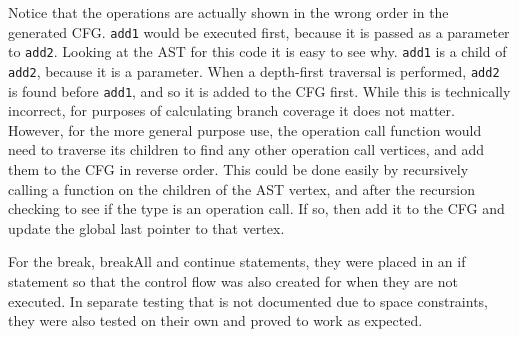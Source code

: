 Notice that the operations are actually shown in the wrong order in the generated CFG. \verb|add1| would be executed first, because it is passed as a parameter to \verb|add2|. Looking at the AST for this code it is easy to see why. \verb|add1| is a child of \verb|add2|, because it is a parameter. When a depth-first traversal is performed, \verb|add2| is found before \verb|add1|, and so it is added to the CFG first. While this is technically incorrect, for purposes of calculating branch coverage it does not matter. However, for the more general purpose use, the operation call function would need to traverse its children to find any other operation call vertices, and add them to the CFG in reverse order. This could be done easily by recursively calling a function on the children of the AST vertex, and after the recursion checking to see if the type is an operation call. If so, then add it to the CFG and update the global last pointer to that vertex.

\begin{figure}
\centering
\begin{minipage}[b]{.25\textwidth}
  \centering
  \caption{}
  \label{fig:testBreak}
\end{minipage}%
\begin{minipage}[b]{.25\textwidth}
  \centering
  \caption{}
  \label{fig:testBreakAll}
\end{minipage}%
\begin{minipage}[b]{.25\textwidth}
  \centering
    \caption{}
  	\label{fig:testContinue}
\end{minipage}
\end{figure}
For the break, breakAll and continue statements, they were placed in an if statement so that the control flow was also created for when they are not executed. In separate testing that is not documented due to space constraints, they were also tested on their own and proved to work as expected.

